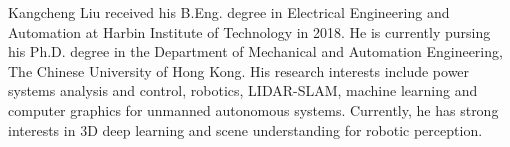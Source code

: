 \documentclass[journal]{IEEEtran}
\begin{document}
 



































































































\ifCLASSOPTIONcaptionsoff
  \newpage
\fi

















\begin{IEEEbiography}{Kangcheng Liu}
 received his B.Eng. degree in Electrical Engineering and Automation at Harbin Institute of Technology in 2018. He is currently pursing his Ph.D. degree in the Department of Mechanical and Automation Engineering, The Chinese University of Hong Kong. His research interests include power systems analysis and control, robotics, LIDAR-SLAM, machine learning and computer graphics for unmanned autonomous systems. Currently, he has strong interests in 3D deep learning and scene understanding for robotic perception.
\end{IEEEbiography}
\end{document}
